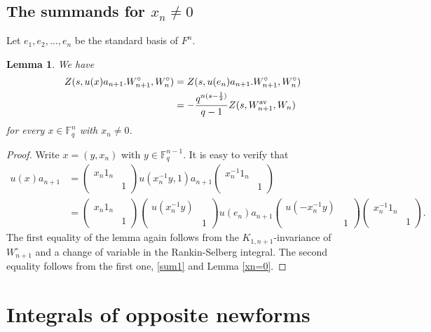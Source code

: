 \documentclass[11pt, a4paper]{amsart}
\theoremstyle{plain}
\theoremstyle{plain}
\theoremstyle{plain}
\newtheorem{leml}[lem]{Lemma}
\theoremstyle{plain}
\theoremstyle{remark}
\theoremstyle{definition}
\theoremstyle{plain}
\numberwithin{equation}{section}
\begin{document}
\subsection{The summands for $x_n\neq 0$}  Let $e_1, e_2,\ldots, e_n$ be the standard basis of $F^n$. 

\begin{leml}\label{xnneq0}
We have 
\[
\begin{aligned}
Z(s, u(x)a_{n+1}.W_{n+1}^\circ, W_n^\circ) & = Z(s, u(e_n)a_{n+1}.W_{n+1}^\circ, W_n^\circ) \\
& = -\frac{q^{n(s-\frac{1}{2})}}{q-1} Z(s, W_{n+1}^{\rm av}, W_n)
\end{aligned}
\]
for every $x\in \mathbb{F}_q^n$ with $x_n\neq 0$.
\end{leml}

\begin{proof}
Write $x= (y, x_n)$ with $y\in \mathbb{F}_q^{n-1}$. It is easy to verify that
\[
\begin{aligned}
u(x) a_{n+1} & = \begin{pmatrix} x_n 1_n &  \\ & 1\end{pmatrix} u(x_n^{-1}y, 1) a_{n+1} \begin{pmatrix} x_n^{-1}1_n \\ & 1\end{pmatrix} \\
&  =  \begin{pmatrix} x_n 1_n & \\ & 1\end{pmatrix} \begin{pmatrix} u(x_n^{-1}y) \\ & 1\end{pmatrix} u(e_n) a_{n+1} \begin{pmatrix} u(-x_n^{-1}y) \\  & 1\end{pmatrix}  \begin{pmatrix} x_n^{-1}1_n \\ & 1\end{pmatrix}.
\end{aligned}
\]
The first equality of the lemma again follows from the $K_{1,n+1}$-invariance of $W_{n+1}^\circ$ and a change of variable in the Rankin-Selberg integral. The second equality follows from the first one, \eqref{sum1} and 
Lemma \ref{xn=0}.
\end{proof}


\section{Integrals of opposite newforms}  \label{sec4}
\end{document}
